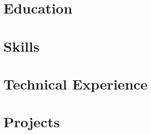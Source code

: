 \documentclass[letter,10pt]{article}
\begin{document}

\section{Education}

\section{Skills}

\section{Technical Experience}

\section{Projects}

\end{document}
